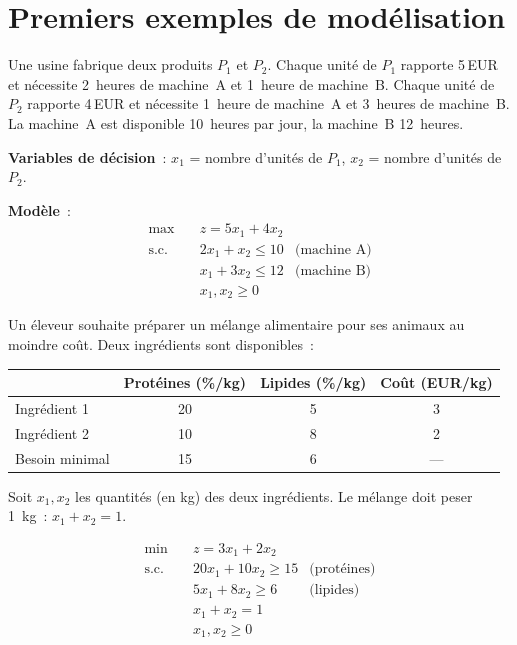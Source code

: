 \section{Premiers exemples de mod\'elisation}

\begin{exemple}
Une usine fabrique deux produits $P_1$ et $P_2$.  Chaque unit\'e de $P_1$
rapporte 5\,EUR et n\'ecessite 2~heures de machine~A et 1~heure de
machine~B.  Chaque unit\'e de $P_2$ rapporte 4\,EUR et n\'ecessite 1~heure
de machine~A et 3~heures de machine~B.  La machine~A est disponible
10~heures par jour, la machine~B 12~heures.

\textbf{Variables de d\'ecision}~:
$x_1$ = nombre d'unit\'es de $P_1$, $x_2$ = nombre d'unit\'es de $P_2$.

\textbf{Mod\`ele}~:
\[
\begin{aligned}
  \max \quad & z = 5x_1 + 4x_2 \\
  \text{s.c.} \quad
    & 2x_1 + x_2 \le 10 & \text{(machine A)} \\
    & x_1 + 3x_2 \le 12  & \text{(machine B)} \\
    & x_1, x_2 \ge 0
\end{aligned}
\]
\end{exemple}

\begin{exemple}
Un \'eleveur souhaite pr\'eparer un m\'elange alimentaire pour ses animaux au
moindre co\^ut.  Deux ingr\'edients sont disponibles~:

\begin{center}
\begin{tabular}{lccc}
  \toprule
  & Prot\'eines (\%/kg) & Lipides (\%/kg) & Co\^ut (EUR/kg) \\
  \midrule
  Ingr\'edient 1 & 20 & 5 & 3 \\
  Ingr\'edient 2 & 10 & 8 & 2 \\
  \midrule
  Besoin minimal & 15 & 6 & --- \\
  \bottomrule
\end{tabular}
\end{center}

Soit $x_1, x_2$ les quantit\'es (en kg) des deux ingr\'edients.  Le m\'elange
doit peser 1~kg~: $x_1 + x_2 = 1$.

\[
\begin{aligned}
  \min \quad & z = 3x_1 + 2x_2 \\
  \text{s.c.} \quad
    & 20x_1 + 10x_2 \ge 15 & \text{(prot\'eines)} \\
    & 5x_1 + 8x_2 \ge 6   & \text{(lipides)} \\
    & x_1 + x_2 = 1 \\
    & x_1, x_2 \ge 0
\end{aligned}
\]
\end{exemple}

